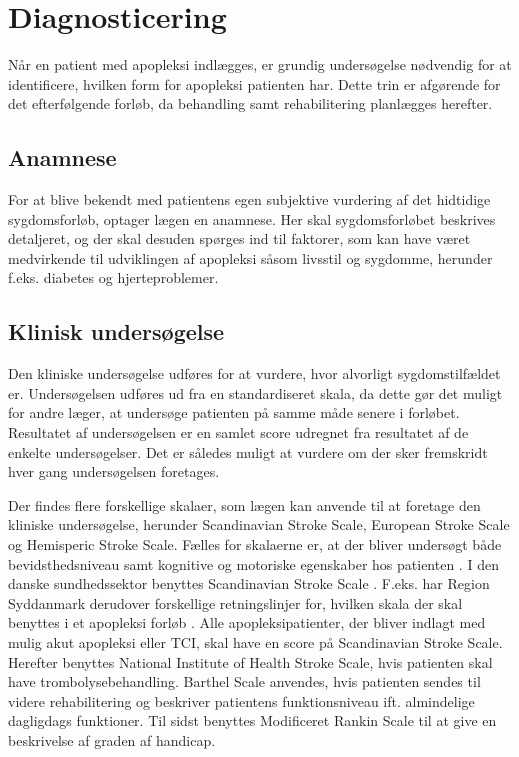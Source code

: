 \section{Diagnosticering}

Når en patient med apopleksi indlægges, er grundig undersøgelse nødvendig for at identificere, hvilken form for apopleksi patienten har. Dette trin er afgørende for det efterfølgende forløb, da behandling samt rehabilitering planlægges herefter. \cite{Sundhedsstyrelsen2009}

\subsection{Anamnese}
For at blive bekendt med patientens egen subjektive vurdering af det hidtidige sygdomsforløb, optager lægen en anamnese. Her skal sygdomsforløbet  beskrives detaljeret, og der skal desuden spørges ind til faktorer, som kan have været medvirkende til udviklingen af apopleksi såsom livsstil og sygdomme, herunder f.eks. diabetes og hjerteproblemer. \cite{Sundhedsstyrelsen2009}

\subsection{Klinisk undersøgelse}
Den kliniske undersøgelse udføres for at vurdere, hvor alvorligt sygdomstilfældet er. Undersøgelsen udføres ud fra en standardiseret skala, da dette gør det muligt for andre læger, at undersøge patienten på samme måde senere i forløbet. Resultatet af undersøgelsen er en samlet score udregnet fra resultatet af de enkelte undersøgelser. Det er således muligt at vurdere om der sker fremskridt hver gang undersøgelsen foretages. \cite{Sundhedsstyrelsen2009}

Der findes flere forskellige skalaer, som lægen kan anvende til at foretage den kliniske undersøgelse, herunder Scandinavian Stroke Scale, European Stroke Scale og Hemisperic Stroke Scale. Fælles for skalaerne er, at der bliver undersøgt både bevidsthedsniveau samt kognitive og motoriske egenskaber hos patienten \cite{Center, Centera, Centerb, Centerc}. I den danske sundhedssektor benyttes Scandinavian Stroke Scale \cite{Apopleksi2009}. F.eks. har Region Syddanmark derudover forskellige retningslinjer for, hvilken skala der skal benyttes i et apopleksi forløb \cite{Syddanmark}. Alle apopleksipatienter, der bliver indlagt med mulig akut apopleksi eller TCI, skal have en score på Scandinavian Stroke Scale. Herefter benyttes National Institute of Health Stroke Scale, hvis patienten skal have trombolysebehandling. Barthel Scale anvendes, hvis patienten sendes til videre rehabilitering og beskriver patientens funktionsniveau ift. almindelige dagligdags funktioner. Til sidst benyttes Modificeret Rankin Scale til at give en beskrivelse af graden af handicap. \cite{Syddanmark}

